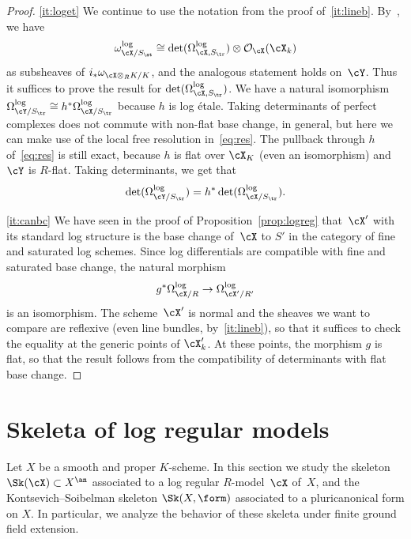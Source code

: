\begin{proof}
\eqref{it:loget} We continue to use the notation from the proof of~\eqref{it:lineb}. By~\cite[5.3.4]{kato-saito}, we have
\[
\omega^{\log}_{\cX/S_{\st}}\cong \det(\Omega^{\log}_{\cX,S_{\tr}})\otimes \mathcal{O}_{\cX}(\cX_k)
\]
as subsheaves of
$i_\ast \omega_{\cX\otimes_R K/K}$, and the analogous statement holds on~$\cY$. Thus it suffices to prove the result for $\det(\Omega^{\log}_{\cX,S_{\tr}})$.
We have a natural isomorphism $\Omega^{\log}_{\cY/S_{\tr}}\cong h^{\ast}\Omega^{\log}_{\cX/S_{\tr}}$ because $h$ is log étale.
Taking determinants of perfect complexes does not commute with non-flat base change, in general, but here we can make use of the local free resolution in~\eqref{eq:res}.
The pullback through $h$ of~\eqref{eq:res} is still exact, because $h$ is flat over $\cX_K$ (even an isomorphism) and~$\cY$ is $R$\nobreakdash-flat.
Taking determinants, we get that
\[
\det(\Omega^{\log}_{\cY/S_{\tr}})=h^{\ast}\det(\Omega^{\log}_{\cX/S_{\tr}}).
\]

\eqref{it:canbc} We have seen in the proof of Proposition~\ref{prop:logreg} that~$\cX'$ with its standard log structure is the
base change of~$\cX$ to $S'$ in the category of fine and saturated log schemes. Since log differentials are compatible with fine and saturated base change, the natural morphism
\[
g^{\ast} \Omega^{\log}_{\cX/R}\to \Omega^{\log}_{\cX'/R'}
\]
is an isomorphism.
The scheme~$\cX'$ is normal and the sheaves we want to compare are reflexive (even line bundles, by~\eqref{it:lineb}), so that it suffices to check the equality at the generic points of $\cX'_k$. At these points, the morphism $g$ is flat, so that the result follows from the compatibility of determinants with flat base change.
\end{proof}

\section{Skeleta of log regular models}\label{sec:skeleta}
Let $X$ be a smooth and proper $K$\nobreakdash-scheme. In this section we study the skeleton $\Sk(\cX)\subset X^{\an}$ associated to a log regular $R$\nobreakdash-model~$\cX$ of~$X$,
and the Kontsevich--Soibelman skeleton $\Sk(X,\form)$ associated to a pluricanonical form on $X$. In particular, we analyze the behavior of these skeleta under finite ground field extension.
